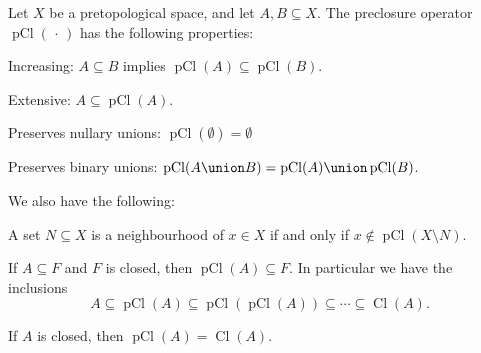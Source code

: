 \documentclass[article, a4paper, 11pt, oneside]{memoir}
\numberwithin{equation}{chapter}
\newcommand{\pCl}[1]{\operatorname{pCl}(#1)}
\renewcommand{\closure}[1]{\operatorname{Cl}(#1)}
\begin{document}
\begin{proposition}
    \label{thm:preclosure-properties}
    Let $X$ be a pretopological space, and let $A,B \subseteq X$. The preclosure operator $\pCl{\,\cdot\,}$ has the following properties:
    \begin{enumprop}
        \item \label{enum:preclosure-increasing} Increasing: $A \subseteq B$ implies $\pCl{A} \subseteq \pCl{B}$.
        
        \item \label{enum:preclosure-extensive} Extensive: $A \subseteq \pCl{A}$.
        
        \item \label{enum:preclosure-nullary-unions} Preserves nullary unions: $\pCl{\emptyset} = \emptyset$
        
        \item \label{enum:preclosure-binary-unions} Preserves binary unions: $\pCl{A \union B} = \pCl{A} \union \pCl{B}$.
    \end{enumprop}
    We also have the following:
    \begin{enumprop}[resume]
        \item \label{enum:preclosure-characterisation-of-nhoods} A set $N \subseteq X$ is a neighbourhood of $x \in X$ if and only if $x \not\in \pCl{X \setminus N}$.

        \item \label{enum:preclosure-inclusion-series} If $A \subseteq F$ and $F$ is closed, then $\pCl{A} \subseteq F$. In particular we have the inclusions
        \begin{equation*}
            A
                \subseteq \pCl{A}
                \subseteq \pCl{\pCl{A}}
                \subseteq \cdots
                \subseteq \closure{A}.
        \end{equation*}
        
        \item \label{enum:preclosure-equals-closure} If $A$ is closed, then $\pCl{A} = \closure{A}$.
    \end{enumprop}
\end{proposition}
\end{document}
